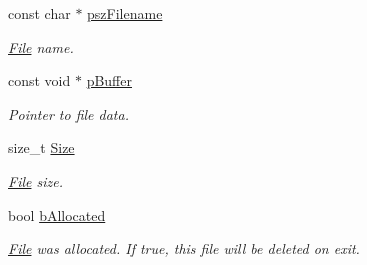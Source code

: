 \begin{DoxyCompactItemize}
\item 
\hypertarget{struct_c_p_v_r_t_memory_file_system_1_1_s_file_info_a8f46ad0601ad8e80a106f722b1ea9e26}{const char $\ast$ \hyperlink{struct_c_p_v_r_t_memory_file_system_1_1_s_file_info_a8f46ad0601ad8e80a106f722b1ea9e26}{psz\+Filename}}\label{struct_c_p_v_r_t_memory_file_system_1_1_s_file_info_a8f46ad0601ad8e80a106f722b1ea9e26}

\begin{DoxyCompactList}\small\item\em \hyperlink{class_file}{File} name. \end{DoxyCompactList}\item 
\hypertarget{struct_c_p_v_r_t_memory_file_system_1_1_s_file_info_aba67fa1712e1f8814a0fede7e702c60b}{const void $\ast$ \hyperlink{struct_c_p_v_r_t_memory_file_system_1_1_s_file_info_aba67fa1712e1f8814a0fede7e702c60b}{p\+Buffer}}\label{struct_c_p_v_r_t_memory_file_system_1_1_s_file_info_aba67fa1712e1f8814a0fede7e702c60b}

\begin{DoxyCompactList}\small\item\em Pointer to file data. \end{DoxyCompactList}\item 
\hypertarget{struct_c_p_v_r_t_memory_file_system_1_1_s_file_info_a71aff5f28ce3e35a143a7bd8ea95ef99}{size\+\_\+t \hyperlink{struct_c_p_v_r_t_memory_file_system_1_1_s_file_info_a71aff5f28ce3e35a143a7bd8ea95ef99}{Size}}\label{struct_c_p_v_r_t_memory_file_system_1_1_s_file_info_a71aff5f28ce3e35a143a7bd8ea95ef99}

\begin{DoxyCompactList}\small\item\em \hyperlink{class_file}{File} size. \end{DoxyCompactList}\item 
\hypertarget{struct_c_p_v_r_t_memory_file_system_1_1_s_file_info_a2474e11e41143c18e79ae141d1e15085}{bool \hyperlink{struct_c_p_v_r_t_memory_file_system_1_1_s_file_info_a2474e11e41143c18e79ae141d1e15085}{b\+Allocated}}\label{struct_c_p_v_r_t_memory_file_system_1_1_s_file_info_a2474e11e41143c18e79ae141d1e15085}

\begin{DoxyCompactList}\small\item\em \hyperlink{class_file}{File} was allocated. If true, this file will be deleted on exit. \end{DoxyCompactList}\end{DoxyCompactItemize}


